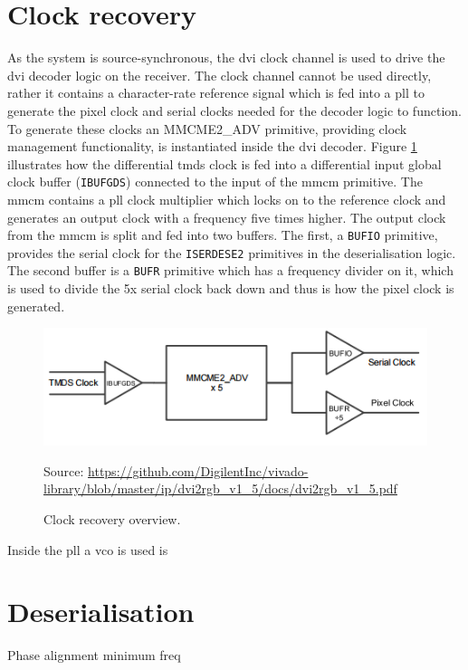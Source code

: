 \section{Clock recovery}
As the system is source-synchronous, the \gls{dvi} clock channel is used to drive the \gls{dvi} decoder logic on the receiver. The clock channel cannot be used directly, rather it contains a character-rate reference signal which is fed into a \gls{pll} to generate the pixel clock and serial clocks needed for the decoder logic to function. To generate these clocks an MMCME2\_ADV primitive, providing clock management functionality, is instantiated inside the \gls{dvi} decoder. Figure \ref{fig:clock_recovery} illustrates how the differential \gls{tmds} clock is fed into a differential input global clock buffer (\texttt{IBUFGDS}) connected to the input of the \gls{mmcm} primitive. The \gls{mmcm} contains a \gls{pll} clock multiplier which locks on to the reference clock and generates an output clock with a frequency five times higher. The output clock from the \gls{mmcm} is split and fed into two buffers. The first, a \texttt{BUFIO} primitive, provides the serial clock for the \texttt{ISERDESE2} primitives in the deserialisation logic. The second buffer is a \texttt{BUFR} primitive which has a frequency divider on it, which is used to divide the 5x serial clock back down and thus is how the pixel clock is generated. 

\begin{figure}
  \centering
  \includegraphics[width=1\textwidth]{./img/clock_recovery.png}\par
  Source: \url{https://github.com/DigilentInc/vivado-library/blob/master/ip/dvi2rgb_v1_5/docs/dvi2rgb_v1_5.pdf}
  \caption{Clock recovery overview.}
  \label{fig:clock_recovery}
\end{figure}

Inside the \gls{pll} a \gls{vco} is used is

\section{Deserialisation}

Phase alignment minimum freq
